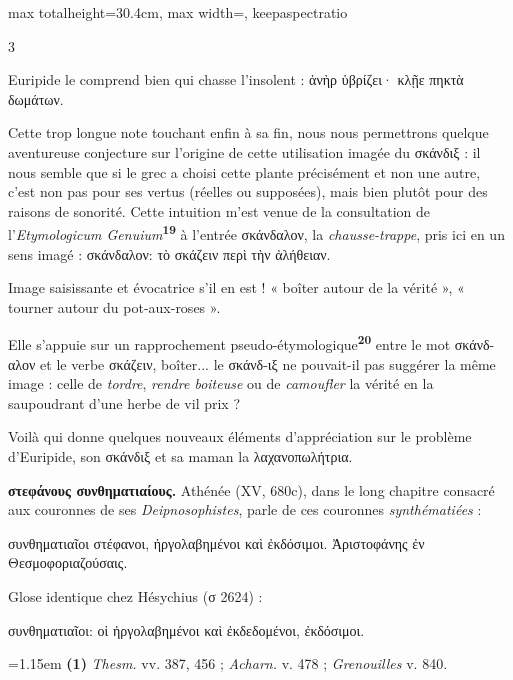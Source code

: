 \documentclass[11pt,twoside]{book}
\newcommand{\italique}[1]{\textit{#1}}
\newcommand{\citComm}[1]{\begin{quoting}[vskip=0.4pt,leftmargin=0.7em,rightmargin=0.2em]#1\end{quoting}}
\newcommand{\latin}[1]{\textit{#1}}
\newcommand{\marqueur}[1]{\textsuperscript{\color{rubricRed}\textbf{#1}}}
\begin{document}
\begin{adjustbox}{max totalheight=30.4cm, max width=\textwidth, keepaspectratio}
\begin{minipage}{\textwidth}
{\begin{multicols}{3}
\par\vspace{1.5pt}
\noindent Euripide le comprend bien qui chasse l'insolent : ἁνὴρ ὑβρίζει· κλῇε πηκτὰ δωμάτων.\\
\par\vspace{1.5pt}
\noindent Cette trop longue note touchant enfin à sa fin, nous nous permettrons quelque aventureuse conjecture sur l'origine de cette utilisation imagée du σκάνδιξ : il nous semble que si le grec a choisi cette plante précisément et non une autre, c'est non pas pour ses vertus (réelles ou supposées), mais bien plutôt pour des raisons de sonorité. Cette intuition m'est venue de la consultation de l'\latin{Etymologicum Genuium}\marqueur{19} à l'entrée σκάνδαλον, la \italique{chausse-trappe}, pris ici en un sens imagé : σκάνδαλον: τὸ σκάζειν περὶ τὴν ἀλήθειαν.
\par\vspace{1.5pt}
\noindent Image saisissante et évocatrice s'il en est ! « boîter autour de la vérité », « tourner autour du pot-aux-roses ».
\par\vspace{1.5pt}
\noindent Elle s'appuie sur un rapprochement pseudo-étymologique\marqueur{20} entre le mot σκάνδ-αλον et le verbe σκάζειν, boîter... le σκάνδ-ιξ ne pouvait-il pas suggérer la même image : celle de \italique{tordre}, \italique{rendre boiteuse} ou de \italique{camoufler} la vérité en la saupoudrant d'une herbe de vil prix ?
\par\vspace{1.5pt}
\noindent Voilà qui donne quelques nouveaux éléments d'appréciation sur le problème d'Euripide, son σκάνδιξ et sa maman la λαχανοπωλήτρια.
\par\vspace{1.5pt}
 \textbf{στεφάνους συνθηματιαίους.} Athénée (XV, 680c), dans le long chapitre consacré aux couronnes de ses \italique{Deipnosophistes}, parle de ces couronnes \italique{synthématiées} :
\citComm{συνθηματιαῖοι στέφανοι, ἠργολαβημένοι καὶ ἐκδόσιμοι. Ἀριστοφάνης ἐν Θεσμοφοριαζούσαις.}
\par\vspace{1.5pt}
\noindent Glose identique chez Hésychius (σ 2624) :
\citComm{συνθηματιαῖοι: οἱ ἠργολαβημένοι καὶ ἐκδεδομένοι, ἐκδόσιμοι.}
\par\vspace{1.5pt}
\par\vspace{1.2pt}\par\nopagebreak\vspace{1pt}\noindent\hangindent=1.15em {\color{sepiaNote}\textbf{(1)}} \italique{Thesm.} vv. 387, 456 ; \italique{Acharn.} v. 478 ; \italique{Grenouilles} v. 840.

\end{multicols}}
\end{minipage}
\end{adjustbox}
\end{document}
